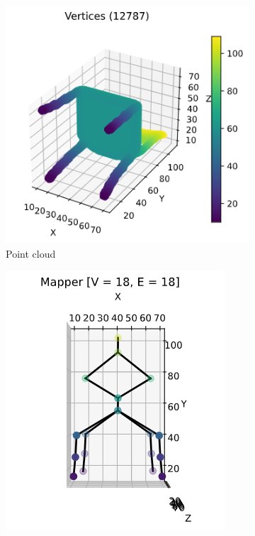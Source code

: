 \documentclass{article}
\begin{document}
\begin{figure}[ht]
    \centering
    \begin{subfigure}[c]{0.3\columnwidth}
        \centering
        \includegraphics[width=\textwidth]{chair-point-cloud}
        \caption{Point cloud}
        \label{fig:chair-points}
    \end{subfigure}
    \begin{subfigure}[c]{0.25\columnwidth}
        \centering
        \includegraphics[width=\textwidth]{chair-graph-3d}

\end{subfigure}
\end{figure}
\end{document}
